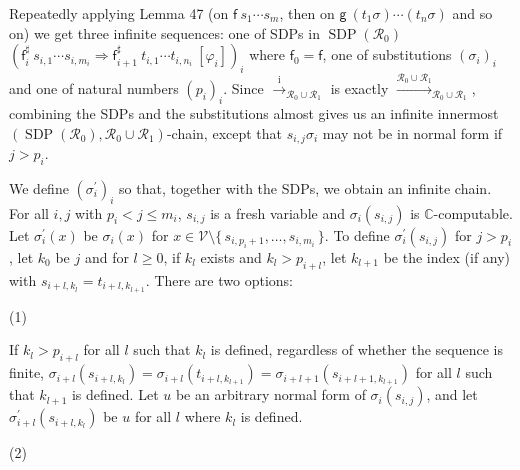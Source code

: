  
Repeatedly applying Lemma 47 (on ${\mathsf{f}}\ {{s}_{1}\cdots{s}_{m}}$, then on ${\mathsf{g}}\ {(t_{1}\sigma)\cdots(t_{n}\sigma)}$ and so on) we get three infinite sequences: one of SDPs in $\operatorname{SDP}(\mathcal{R}_{0})$ $({{\mathsf{f}_{i}^{\sharp}}\ {{s}_{i,1}\cdots{s}_{i,m_{i}}}}\Rightarrow{{\mathsf{f}_{i+1}^{\sharp}}\ {{t}_{i,1}\cdots{t}_{i,n_{i}}}}\ [\varphi_{i}])_{i}$ where $\mathsf{f}_{0}=\mathsf{f}$, one of substitutions $(\sigma_{i})_{i}$ and one of natural numbers $(p_{i})_{i}$. Since $\xrightarrow{\scriptscriptstyle\mathrm{i}}_{\mathcal{R}_{0}\cup\mathcal{R}_{1}}$ is exactly $\xrightarrow{\scriptscriptstyle\mathcal{R}_{0}\cup\mathcal{R}_{1}}_{\mathcal{R}_{0}\cup\mathcal{R}_{1}}$, combining the SDPs and the substitutions almost gives us an infinite innermost $(\operatorname{SDP}(\mathcal{R}_{0}),\mathcal{R}_{0}\cup\mathcal{R}_{1})$-chain, except that $s_{i,j}\sigma_{i}$ may not be in normal form if $j>p_{i}$.\par
 
 
 
We define $(\sigma^{\prime}_{i})_{i}$ so that, together with the SDPs, we obtain an infinite chain. For all $i,j$ with $p_{i}<j\leq m_{i}$, $s_{i,j}$ is a fresh variable and $\sigma_{i}(s_{i,j})$ is $\mathbb{C}$-computable. Let $\sigma^{\prime}_{i}(x)$ be $\sigma_{i}(x)$ for $x\in\mathcal{V}\setminus\{\,{s}_{i,p_{i}+1},\ldots,{s}_{i,m_{i}}\,\}$. To define $\sigma^{\prime}_{i}(s_{i,j})$ for $j>p_{i}$, let $k_{0}$ be $j$ and for $l\geq 0$, if $k_{l}$ exists and $k_{l}>p_{i+l}$, let $k_{l+1}$ be the index (if any) with $s_{i+l,k_{l}}=t_{i+l,k_{l+1}}$. There are two options:\par
  
\par\noindent  (1) 
 
If $k_{l}>p_{i+l}$ for all $l$ such that $k_{l}$ is defined, regardless of whether the sequence is finite, $\sigma_{i+l}(s_{i+l,k_{l}})=\sigma_{i+l}(t_{i+l,k_{l+1}})=\sigma_{i+l+1}(s_{i+l+1,k_{l+1}})$ for all $l$ such that $k_{l+1}$ is defined. Let $u$ be an arbitrary normal form of $\sigma_{i}(s_{i,j})$, and let $\sigma^{\prime}_{i+l}(s_{i+l,k_{l}})$ be $u$ for all $l$ where $k_{l}$ is defined.\par
 
 
 
\par\noindent  (2) 
 
